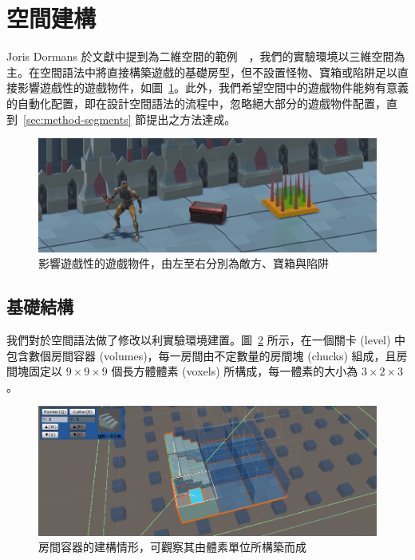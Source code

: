 \clearpage

\section{空間建構}
\label{sec:method-spacepieces}

Joris Dormans 於文獻中提到為二維空間的範例~\cite{dormans2010adventures}~\cite{dormans2012engineering}，我們的實驗環境以三維空間為主。在空間語法中將直接構築遊戲的基礎房型，但不設置怪物、寶箱或陷阱足以直接影響遊戲性的遊戲物件，如圖~\ref{fig:gameobject-list}。此外，我們希望空間中的遊戲物件能夠有意義的自動化配置，即在設計空間語法的流程中，忽略絕大部分的遊戲物件配置，直到~\ref{sec:method-segments} 節提出之方法達成。

\begin{figure}[ht]
  \begin{center}
    \includegraphics[width=1.0\textwidth]{figures/gameobject-list.png}
    \caption{影響遊戲性的遊戲物件，由左至右分別為敵方、寶箱與陷阱} 
    \label{fig:gameobject-list}
  \end{center}
\end{figure}

\subsection{基礎結構}
\label{ssec:method-spacepieces-basic}

我們對於空間語法做了修改以利實驗環境建置。圖~\ref{fig:spacepieces-structure} 所示，在一個關卡 (level) 中包含數個房間容器 (volumes)，每一房間由不定數量的房間塊 (chucks) 組成，且房間塊固定以 $9\times 9\times 9$ 個長方體體素 (voxels) 所構成，每一體素的大小為 $3\times 2\times 3$。

\begin{figure}[ht]
  \begin{center}
    \includegraphics[width=1.0\textwidth]{figures/spacepieces-structure.png}
    \caption{房間容器的建構情形，可觀察其由體素單位所構築而成} 
    \label{fig:spacepieces-structure}
  \end{center}
\end{figure}

